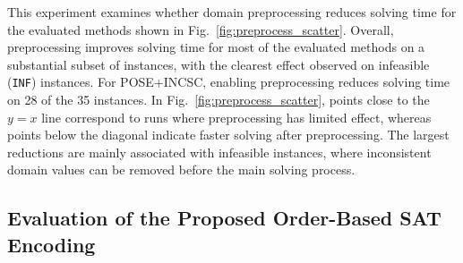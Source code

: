 \documentclass[letterpaper,journal]{IEEEtran}
\begin{document}
This experiment examines whether domain preprocessing reduces solving time for the evaluated methods shown in Fig.~\ref{fig:preprocess_scatter}. 
Overall, preprocessing improves solving time for most of the evaluated methods on a substantial subset of instances, with the clearest effect observed on infeasible (\texttt{INF}) instances. For POSE+INCSC, enabling preprocessing reduces solving time on 28 of the 35 instances. 
In Fig.~\ref{fig:preprocess_scatter}, points close to the $y=x$ line correspond to runs where preprocessing has limited effect, whereas points below the diagonal indicate faster solving after preprocessing. The largest reductions are mainly associated with infeasible instances, where inconsistent domain values can be removed before the main solving process.

\subsection{Evaluation of the Proposed Order-Based SAT Encoding}
\end{document}
